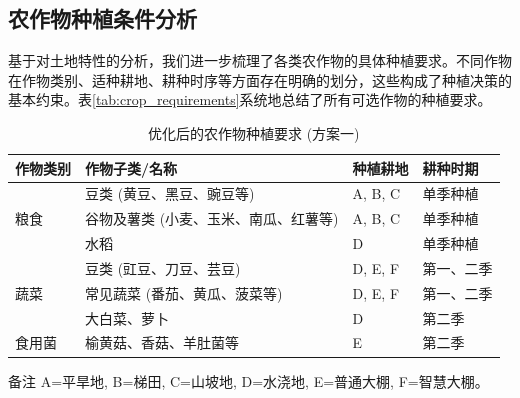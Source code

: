 \subsection{农作物种植条件分析}

基于对土地特性的分析，我们进一步梳理了各类农作物的具体种植要求。不同作物在作物类别、适种耕地、耕种时序等方面存在明确的划分，这些构成了种植决策的基本约束。表\ref{tab:crop_requirements}系统地总结了所有可选作物的种植要求。

\begin{table}[htbp]
    \centering
    \begin{threeparttable}
        \caption{优化后的农作物种植要求 (方案一)}
        \label{tab:crop_requirements_optimized_1}
        \begin{tabularx}{\columnwidth}{l l >{\raggedright\arraybackslash}X l}
            \toprule
            作物类别 & 作物子类/名称 & 种植耕地 & 耕种时期 \\
            \midrule
            \multirow{3}{*}{粮食}
            & 豆类 (黄豆、黑豆、豌豆等) & A, B, C & 单季种植 \\
            \addlinespace %
            & 谷物及薯类 (小麦、玉米、南瓜、红薯等) & A, B, C & 单季种植 \\
            \addlinespace
            & 水稻 & D & 单季种植 \\
            \midrule
            \multirow{3}{*}{蔬菜}
            & 豆类 (豇豆、刀豆、芸豆) & D, E, F & 第一、二季 \\
            \addlinespace
            & 常见蔬菜 (番茄、黄瓜、菠菜等) & D, E, F & 第一、二季 \\
            \addlinespace
            & 大白菜、萝卜 & D & 第二季 \\
            \midrule
            食用菌 & 榆黄菇、香菇、羊肚菌等 & E & 第二季 \\
            \bottomrule
        \end{tabularx}
        \begin{tablenotes}[flushleft]
            \footnotesize %
            \item[备注] A=平旱地, B=梯田, C=山坡地, D=水浇地, E=普通大棚, F=智慧大棚。
        \end{tablenotes}
    \end{threeparttable}
\end{table}


